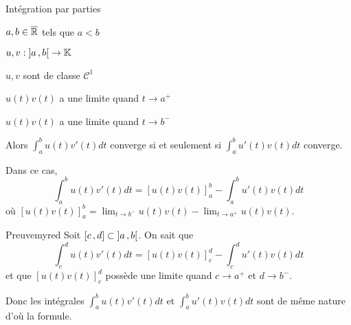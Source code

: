     \begin{theo}{Intégration par parties}{}
        \begin{soient}
            \item $a, b \in \overline{\mathbb{R}}$ tels que $a < b$
            \item $u,v : \left] a \, , b \right[ \to \mathbb{K}$
        \end{soient}
        \begin{suppose}
            \item $u,v$ sont de classe $\mathcal{C}^1$
            \item $u(t)v(t)$ a une limite quand $t \to a^+$
            \item $u(t)v(t)$ a une limite quand $t \to b^-$
        \end{suppose}
        Alors $\int_{a}^{b} u(t)v'(t)dt$ converge si et seulement si $\int_{a}^{b} u'(t)v(t) dt$ converge.

        Dans ce cas, 
        \[ \int_{a}^{b} u(t)v'(t)dt = \left[u(t)v(t)\right]_a^b - \int_{a}^{b} u'(t)v(t)dt \]   
        où $\left[u(t)v(t)\right]_a^b = \lim_{t \to b^-} u(t)v(t) - \lim_{t \to a^+} u(t)v(t)$.
    \end{theo}

    \begin{demo}{Preuve}{myred}
        Soit $\left[ c \, , d \right] \subset \left] a \, , b \right[$. On sait que 
        \[ \int_{c}^{d} u(t)v'(t)dt = \left[u(t)v(t)\right]_c^d - \int_{c}^{d} u'(t)v(t)dt \]    
        et que $\left[u(t)v(t)\right]_c^d$ possède une limite quand $c \to a^+$ et $d \to b^-$.

        Donc les intégrales $\int_{a}^{b} u(t)v'(t)dt$ et $\int_{a}^{b} u'(t)v(t) dt$ sont de même nature d’où la formule.
    \end{demo}


